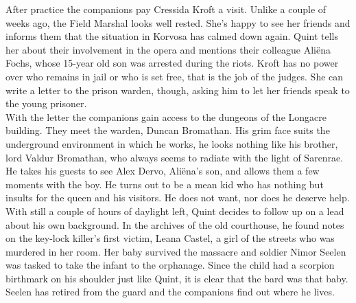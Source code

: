 After practice the companions pay Cressida Kroft a visit. Unlike a couple of weeks ago, the Field Marshal looks well rested. She's happy to see her friends and informs them that the situation in Korvosa has calmed down again. Quint tells her about their involvement in the opera and mentions their colleague Ali\"ena Fochs, whose 15-year old son was arrested during the riots. Kroft has no power over who remains in jail or who is set free, that is the job of the judges. She can write a letter to the prison warden, though, asking him to let her friends speak to the young prisoner.\\

With the letter the companions gain access to the dungeons of the Longacre building. They meet the warden, Duncan Bromathan. His grim face suits the underground environment in which he works, he looks nothing like his brother, lord Valdur Bromathan, who always seems to radiate with the light of Sarenrae. He takes his guests to see Alex Dervo, Ali\"ena's son, and allows them a few moments with the boy. He turns out to be a mean kid who has nothing but insults for the queen and his visitors. He does not want, nor does he deserve help.\\

With still a couple of hours of daylight left, Quint decides to follow up on a lead about his own background. In the archives of the old courthouse, he found notes on the key-lock killer's first victim, Leana Castel, a girl of the streets who was murdered in her room. Her baby survived the massacre and soldier Nimor Seelen was tasked to take the infant to the orphanage. Since the child had a scorpion birthmark on his shoulder just like Quint, it is clear that the bard was that baby. Seelen has retired from the guard and the companions find out where he lives.\\


